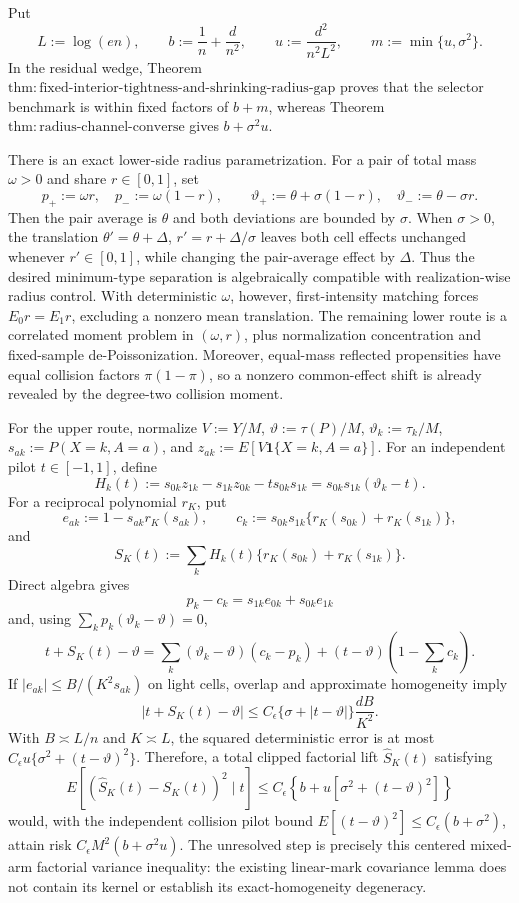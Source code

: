 Put
\[
 L:=\log(en),\qquad b:=\frac1n+\frac d{n^2},\qquad
 u:=\frac{d^2}{n^2L^2},\qquad m:=\min\{u,\sigma^2\}.
\]
In the residual wedge, Theorem~\(\mathrm{thm:fixed\text{-}interior\text{-}tightness\text{-}and\text{-}shrinking\text{-}radius\text{-}gap}\) proves that the selector benchmark is within fixed factors of \(b+m\), whereas Theorem~\(\mathrm{thm:radius\text{-}channel\text{-}converse}\) gives \(b+\sigma^2u\).

There is an exact lower-side radius parametrization.  For a pair of total mass \(\omega>0\) and share \(r\in[0,1]\), set
\[
 p_+:=\omega r,\quad p_-:=\omega(1-r),\qquad
 \vartheta_+:=\theta+\sigma(1-r),\quad
 \vartheta_-:=\theta-\sigma r.
\]
Then the pair average is \(\theta\) and both deviations are bounded by \(\sigma\).  When \(\sigma>0\), the translation \(\theta'=\theta+\Delta\), \(r'=r+\Delta/\sigma\) leaves both cell effects unchanged whenever \(r'\in[0,1]\), while changing the pair-average effect by \(\Delta\).  Thus the desired minimum-type separation is algebraically compatible with realization-wise radius control.  With deterministic \(\omega\), however, first-intensity matching forces \(E_0r=E_1r\), excluding a nonzero mean translation.  The remaining lower route is a correlated moment problem in \((\omega,r)\), plus normalization concentration and fixed-sample de-Poissonization.  Moreover, equal-mass reflected propensities have equal collision factors \(\pi(1-\pi)\), so a nonzero common-effect shift is already revealed by the degree-two collision moment.

For the upper route, normalize \(V:=Y/M\), \(\vartheta:=\tau(P)/M\), \(\vartheta_k:=\tau_k/M\), \(s_{ak}:=P(X=k,A=a)\), and \(z_{ak}:=E[V\mathbf1\{X=k,A=a\}]\).  For an independent pilot \(t\in[-1,1]\), define
\[
 H_k(t):=s_{0k}z_{1k}-s_{1k}z_{0k}-ts_{0k}s_{1k}
 =s_{0k}s_{1k}(\vartheta_k-t).
\]
For a reciprocal polynomial \(r_K\), put
\[
 e_{ak}:=1-s_{ak}r_K(s_{ak}),\qquad
 c_k:=s_{0k}s_{1k}\{r_K(s_{0k})+r_K(s_{1k})\},
\]
and
\[
 S_K(t):=\sum_kH_k(t)\{r_K(s_{0k})+r_K(s_{1k})\}.
\]
Direct algebra gives
\[
 p_k-c_k=s_{1k}e_{0k}+s_{0k}e_{1k}
\]
and, using \(\sum_kp_k(\vartheta_k-\vartheta)=0\),
\[
 t+S_K(t)-\vartheta
 =\sum_k(\vartheta_k-\vartheta)(c_k-p_k)
 +(t-\vartheta)\left(1-\sum_kc_k\right).
\]
If \(|e_{ak}|\le B/(K^2s_{ak})\) on light cells, overlap and approximate homogeneity imply
\[
 |t+S_K(t)-\vartheta|
 \le C_\epsilon\{\sigma+|t-\vartheta|\}\frac{dB}{K^2}.
\]
With \(B\asymp L/n\) and \(K\asymp L\), the squared deterministic error is at most \(C_\epsilon u\{\sigma^2+(t-\vartheta)^2\}\).  Therefore, a total clipped factorial lift \(\widehat S_K(t)\) satisfying
\[
 E[(\widehat S_K(t)-S_K(t))^2\mid t]
 \le C_\epsilon\left\{b+u[\sigma^2+(t-\vartheta)^2]\right\}
\]
would, with the independent collision pilot bound \(E[(t-\vartheta)^2]\le C_\epsilon(b+\sigma^2)\), attain risk \(C_\epsilon M^2(b+\sigma^2u)\).  The unresolved step is precisely this centered mixed-arm factorial variance inequality: the existing linear-mark covariance lemma does not contain its kernel or establish its exact-homogeneity degeneracy.